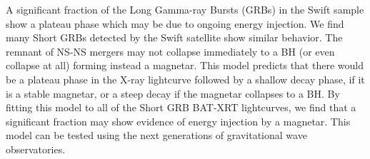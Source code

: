 


\bigskip



\bigskip

\noindent A significant fraction of the Long Gamma-ray Bursts (GRBs) in the Swift sample show a plateau phase which may be due to ongoing energy injection. We find many Short GRBs detected by the Swift satellite show similar behavior. The remnant of NS-NS mergers may not collapse immediately to a BH (or even collapse at all) forming instead a magnetar. This model predicts that there would be a plateau phase in the X-ray lightcurve followed by a shallow decay phase, if it is a stable magnetar, or a steep decay if the magnetar collapses to a BH. By fitting this model to all of the Short GRB BAT-XRT lightcurves, we find that a significant fraction may show evidence of energy injection by a magnetar. This model can be tested using the next generations of gravitational wave observatories.

